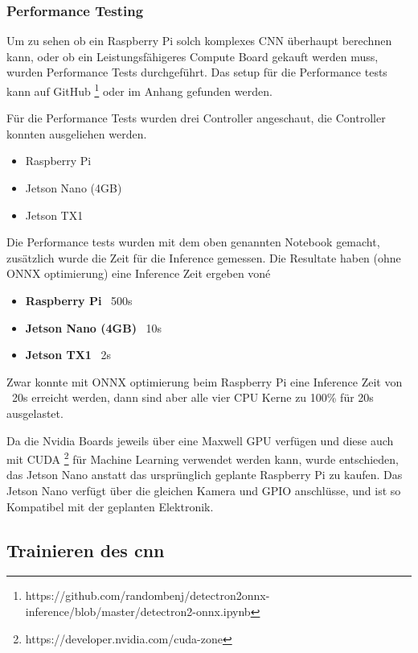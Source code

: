 \subsubsection{Performance Testing}

Um zu sehen ob ein Raspberry Pi solch komplexes \acrshort{CNN} überhaupt berechnen kann, oder ob ein
Leistungsfähigeres Compute Board gekauft werden muss, wurden Performance Tests durchgeführt.
Das setup für die Performance tests kann auf GitHub \footnote{https://github.com/randombenj/detectron2onnx-inference/blob/master/detectron2-onnx.ipynb} oder im Anhang
gefunden werden.

Für die Performance Tests wurden drei Controller angeschaut, die Controller konnten ausgeliehen werden.

\begin{itemize}
    \item Raspberry Pi
    \item Jetson Nano (4GB)
    \item Jetson TX1
\end{itemize}


Die Performance tests wurden mit dem oben genannten Notebook gemacht, zusätzlich wurde die Zeit für die
Inference gemessen. Die Resultate haben (ohne ONNX optimierung) eine Inference Zeit ergeben voné

\begin{itemize}
    \item {\bf Raspberry Pi}  ~500s
    \item {\bf Jetson Nano (4GB)} ~10s
    \item {\bf Jetson TX1} ~2s
\end{itemize}

Zwar konnte mit ONNX optimierung beim Raspberry Pi eine Inference Zeit von ~20s erreicht werden, 
dann sind aber alle vier CPU Kerne zu 100\% für 20s ausgelastet.

Da die Nvidia Boards jeweils über eine Maxwell GPU verfügen und diese auch mit CUDA \footnote{https://developer.nvidia.com/cuda-zone}
für Machine Learning verwendet werden kann, wurde entschieden, das Jetson Nano anstatt das ursprünglich geplante
Raspberry Pi zu kaufen. Das Jetson Nano verfügt über die gleichen Kamera und GPIO anschlüsse, und 
ist so Kompatibel mit der geplanten Elektronik.

\subsection{Trainieren des \acrshort{cnn}}

